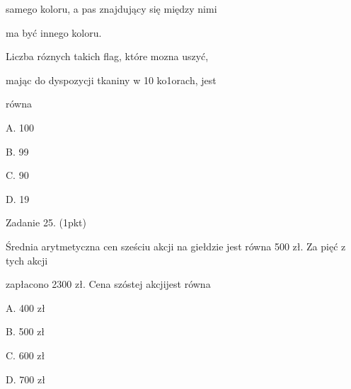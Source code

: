 \documentclass[a4paper,12pt]{article}
\begin{document}
samego koloru, a pas znajdujący się między nimi

ma być innego koloru.

Liczba róznych takich flag, które mozna uszyć,

mając do dyspozycji tkaniny w 10 ko1orach, jest

równa

A. 100

B. 99

C. 90

D. 19

Zadanie 25. (1pkt)

Średnia arytmetyczna cen sześciu akcji na giełdzie jest równa 500 zł. Za pięć z tych akcji

zapłacono 2300 zł. Cena szóstej akcjijest równa

A. 400 zł

B. 500 zł

C. 600 zł

D. 700 zł
\end{document}
